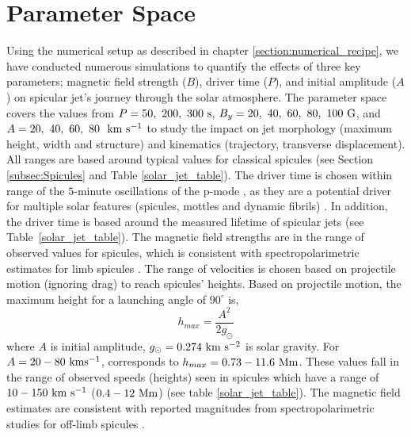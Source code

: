 \section{Parameter Space}
\label{subsec:paramater_space}
Using the numerical setup as described in chapter \ref{section:numerical_recipe}, we have conducted numerous simulations to quantify the effects of three key parameters; magnetic field strength ($B$), driver time ($P$), and initial amplitude ($A$) on spicular jet's journey through the solar atmosphere. The parameter space covers the values from $P=50,~200,~300~\rm{s}$, $B_y=20,~40,~60,~80,~100~\rm{G}$, and $A=20,~40,~60,~80~~\rm{km ~s^{-1}}$ to study the impact on jet morphology (maximum height, width and structure) and kinematics (trajectory, transverse displacement). All ranges are based around typical values for classical spicules (see Section \ref{subsec:Spicules} and Table \ref{solar_jet_table}). The driver time is chosen within range of the $5$-minute oscillations of the p-mode \citep{Leighton1962ApJ135474L}, as they are a potential driver for multiple solar features (spicules, mottles  and dynamic fibrils) \citep{Pontieu2004Natur}. In addition, the driver time is based around the measured lifetime of spicular jets (see Table~\ref{solar_jet_table}). The magnetic field strengths are in the range of observed values for spicules, which is consistent with spectropolarimetric estimates for limb spicules \citep{centeno2010, suarez2015}. The range of velocities is chosen based on projectile motion (ignoring drag) to reach spicules' heights. Based on projectile motion, the maximum height for a launching angle of $90^{\circ}$ is,
\begin{equation}
h_{max} = \frac{A^2}{2g_{\odot}}
\end{equation}
where $A$ is initial amplitude, $g_{\odot}=0.274~\rm{km~s^{-2}}$ is solar gravity. For $A=20-80~\rm{km s^{-1}}$, corresponds to $h_{max}=0.73-11.6~\rm{Mm}$. These values fall in the range of observed speeds (heights) seen in spicules which have a range of $10-150~\rm{km ~s^{-1}}$ ($0.4-12~\rm{Mm}$) (see table \ref{solar_jet_table}). The magnetic field estimates are consistent with reported magnitudes from spectropolarimetric studies for off-limb spicules \citep{centeno2010, suarez2015}.

